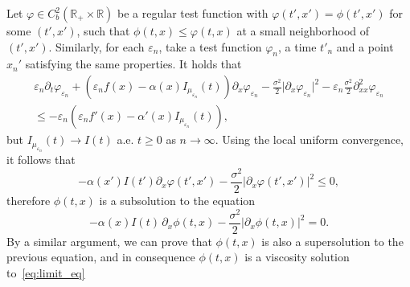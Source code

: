 \documentclass[onefignum,onetabnum]{siamart190516}
\newcommand{\R}{\mathbb{R}}
\newcommand{\1}{\mathbbm{1}}
\newcommand{\eps}{\varepsilon}
\begin{document}
\begin{itemize}
Let $\varphi\in C_b^2(\R_+\times\R)$ be a regular test function with $\varphi(t',x')=\phi(t',x')$ for some $(t',x')$, such that $\phi(t,x)\leq\varphi(t,x)$ at a small neighborhood of $(t',x')$. Similarly, for each $\eps_n$, take a test function $\varphi_{n}$, a time $t'_n$ and a point $x_n'$ satisfying the same properties. It holds that
\begin{multline*}
\eps_n\partial_t\varphi_{\eps_n} +  \left(\eps_n f(x)- \alpha(x) I_{\mu_{\eps_n}}(t)\right)\partial_x\varphi_{\eps_n} - \frac{\sigma^2}{2} \vert \partial_x \varphi_{\eps_n} \vert^2  - \eps_n\frac {\sigma^2}{2} \partial_{xx}^2 \varphi_{\eps_n}
\\
\leq -\eps_n\left(\eps_n f'(x) - \alpha'(x)I_{\mu_{\eps_n}}(t) \right),
\end{multline*}
but $I_{\mu_{\eps_n}}(t)\rightarrow I(t)$ a.e. $t\geq0$ as $n\rightarrow\infty$. Using the local uniform convergence, it follows that
$$
-\alpha(x')I(t')\partial_x\varphi(t',x')-\frac{\sigma^2}{2}|\partial_x\varphi(t',x')|^2\leq 0,
$$
therefore $\phi(t,x)$ is a subsolution to the equation
\begin{equation}
\label{eq:limit_eq}
-\alpha(x) I(t)\, \partial_x\phi(t,x)-\frac{\sigma^2}{2}|\partial_x\phi(t,x)|^2= 0.
\end{equation}
By a similar argument, we can prove that $\phi(t,x)$ is also a supersolution to the previous equation, and in consequence $\phi(t,x)$ is a viscosity solution to~\eqref{eq:limit_eq}
\end{itemize}
\end{document}
